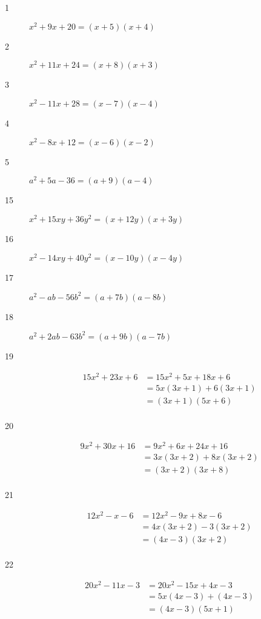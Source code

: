 \documentclass[fleqn,addpoints]{exam}
\begin{document}
\begin{description}

\item[1]
\( x^2 + 9x + 20 = (x + 5)(x + 4) \)

\item[2]
\( x^2 + 11x + 24 = (x + 8)(x + 3) \)

\item[3]
\( x^2 - 11x + 28 = (x - 7)(x - 4) \)

\item[4]
\( x^2 - 8x + 12 = (x - 6)(x - 2) \)

\item[5]
\( a^2 + 5a - 36 = (a + 9)(a - 4) \)

\item[15]
\( x^2 + 15xy + 36y^2 = (x + 12y)(x + 3y) \)

\item[16]
\( x^2 - 14xy + 40y^2 = (x - 10y)(x - 4y) \)

\item[17]
\( a^2 - ab - 56b^2 = (a + 7b)(a - 8b) \)

\item[18]
\( a^2 + 2ab - 63b^2 = (a + 9b)(a - 7b) \)

\item[19]
\begin{align*}
15x^2 + 23x + 6 &= 15x^2 + 5x + 18x + 6 \\
 &= 5x(3x + 1) + 6(3x + 1) \\
 &= (3x + 1)(5x + 6)  \\
\end{align*}

\item[20]
\begin{align*}
  9x^2 + 30x + 16 &= 9x^2 + 6x + 24x + 16 \\
  &= 3x(3x + 2) + 8x(3x + 2) \\
  &= (3x + 2)(3x + 8) \\
\end{align*}

\item[21]
\begin{align*}
  12x^2 - x - 6 &= 12x^2 - 9x + 8x - 6 \\
  &= 4x(3x + 2) - 3(3x + 2) \\
  &= (4x - 3)(3x + 2) \\
\end{align*}

\item[22]
\begin{align*}
  20x^2 - 11x - 3 &= 20x^2 - 15x + 4x - 3 \\
  &= 5x(4x - 3) + (4x - 3) \\
  &= (4x - 3)(5x + 1) \\  
\end{align*}


\end{description}
\end{document}
